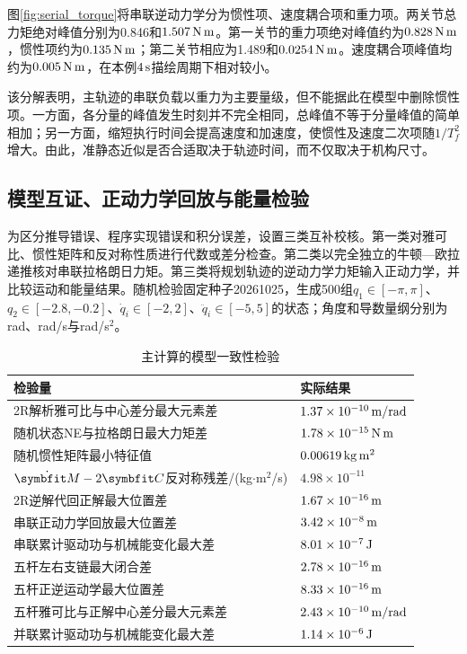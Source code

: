 图\ref{fig:serial_torque}将串联逆动力学分为惯性项、速度耦合项和重力项。两关节总力矩绝对峰值分别为0.846和$1.507\,\mathrm{N\,m}$。第一关节的重力项绝对峰值约为$0.828\,\mathrm{N\,m}$，惯性项约为$0.135\,\mathrm{N\,m}$；第二关节相应为1.489和$0.0254\,\mathrm{N\,m}$。速度耦合项峰值均约为$0.005\,\mathrm{N\,m}$，在本例$4\,\mathrm{s}$描绘周期下相对较小。

该分解表明，主轨迹的串联负载以重力为主要量级，但不能据此在模型中删除惯性项。一方面，各分量的峰值发生时刻并不完全相同，总峰值不等于分量峰值的简单相加；另一方面，缩短执行时间会提高速度和加速度，使惯性及速度二次项随$1/T_f^2$增大。由此，准静态近似是否合适取决于轨迹时间，而不仅取决于机构尺寸。


\subsection{模型互证、正动力学回放与能量检验}
\label{sec:validation}

为区分推导错误、程序实现错误和积分误差，设置三类互补校核。第一类对雅可比、惯性矩阵和反对称性质进行代数或差分检查。第二类以完全独立的牛顿—欧拉递推核对串联拉格朗日力矩。第三类将规划轨迹的逆动力学力矩输入正动力学，并比较运动和能量结果。随机检验固定种子20261025，生成500组$q_1\in[-\pi,\pi]$、$q_2\in[-2.8,-0.2]$、$\dot q_i\in[-2,2]$、$\ddot q_i\in[-5,5]$的状态；角度和导数量纲分别为rad、rad/s与rad/s$^2$。

\begin{table}[htbp]
\centering\caption{主计算的模型一致性检验}\label{tab:validation}
\small\begin{tabularx}{\linewidth}{@{}Xl@{}}\toprule 检验量 & 实际结果\\\midrule
2R解析雅可比与中心差分最大元素差 & $1.37\times10^{-10}\,\mathrm{m/rad}$\\
随机状态NE与拉格朗日最大力矩差 & $1.78\times10^{-15}\,\mathrm{N\,m}$\\
随机惯性矩阵最小特征值 & $0.00619\,\mathrm{kg\,m^2}$\\
$\dot{\vect M}-2\vect C$反对称残差/(kg$\cdot$m$^2$/s) & $4.98\times10^{-11}$\\
2R逆解代回正解最大位置差 & $1.67\times10^{-16}\,\mathrm{m}$\\
串联正动力学回放最大位置差 & $3.42\times10^{-8}\,\mathrm{m}$\\
串联累计驱动功与机械能变化最大差 & $8.01\times10^{-7}\,\mathrm{J}$\\
五杆左右支链最大闭合差 & $2.78\times10^{-16}\,\mathrm{m}$\\
五杆正逆运动学最大位置差 & $8.33\times10^{-16}\,\mathrm{m}$\\
五杆雅可比与正解中心差分最大元素差 & $2.43\times10^{-10}\,\mathrm{m/rad}$\\
并联累计驱动功与机械能变化最大差 & $1.14\times10^{-6}\,\mathrm{J}$\\\bottomrule
\end{tabularx}
\end{table}

